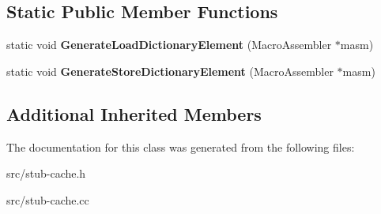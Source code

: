 \subsection*{Static Public Member Functions}
\begin{DoxyCompactItemize}
\item 
\hypertarget{classv8_1_1internal_1_1_element_handler_compiler_aaaaae055325bda472661bc7ac6f383d6}{}static void {\bfseries Generate\+Load\+Dictionary\+Element} (Macro\+Assembler $\ast$masm)\label{classv8_1_1internal_1_1_element_handler_compiler_aaaaae055325bda472661bc7ac6f383d6}

\item 
\hypertarget{classv8_1_1internal_1_1_element_handler_compiler_a322d6d57e4f21e663f1f8c84626ef347}{}static void {\bfseries Generate\+Store\+Dictionary\+Element} (Macro\+Assembler $\ast$masm)\label{classv8_1_1internal_1_1_element_handler_compiler_a322d6d57e4f21e663f1f8c84626ef347}

\end{DoxyCompactItemize}
\subsection*{Additional Inherited Members}


The documentation for this class was generated from the following files\+:\begin{DoxyCompactItemize}
\item 
src/stub-\/cache.\+h\item 
src/stub-\/cache.\+cc\end{DoxyCompactItemize}
